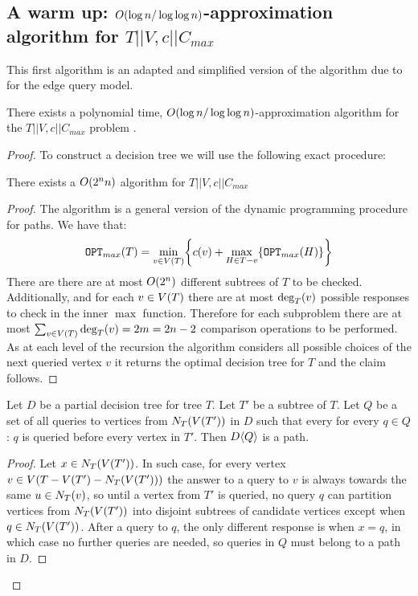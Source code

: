 \subsection{A warm up: $O\mathopen{}\left( \log n/\log\log n \right)$-approximation algorithm  for $T||V,c||C_{max}$}
This first algorithm is an adapted and simplified version of the algorithm due to \cite{Cicalese2016OnTSPwNonUniCost} for the edge query model.
\begin{theorem}
    There exists a polynomial time, $O\mathopen{}\left( \log n/\log\log n \right)$-approximation algorithm for the $T||V,c||C_{max}$ problem .
    \begin{proof}
        
To construct a decision tree we will use the following exact procedure:
\begin{lemma}
    There exists a $O\mathopen{}\left( 2^nn \right)$ algorithm for $T||V,c||C_{max}$
    \begin{proof}
        The algorithm is a general version of the dynamic programming procedure for paths. We have that:
        $$
        \texttt{OPT}_{max}\mathopen{}\left( T \right) = \min_{v\in V\mathopen{}\left( T \right)}\mathopen{}\left\{ c\mathopen{}\left( v \right)+\max_{H\in T-v}\mathopen{}\left\{ \texttt{OPT}_{max}\mathopen{}\left( H \right) \right\} \right\}
        $$
        There are there are at most $O\mathopen{}\left( 2^n \right)$ different subtrees of $T$ to be checked. Additionally, and for each $v\in V\mathopen{}\left( T \right)$ there are at most $\deg_T\mathopen{}\left( v \right)$ possible responses to check in the inner $\max$ function. Therefore for each subproblem there are at most
        $
        \sum_{v\in V\mathopen{}\left( T \right)}\deg_T\mathopen{}\left( v \right) = 2m = 2n-2
        $
        comparison operations to be performed. As at each level of the recursion the algorithm considers all possible choices of the next queried vertex $v$ it returns the optimal decision tree for $T$ and the claim follows.
    \end{proof}
\end{lemma}
\begin{observation}\label{neighborsPathObservation}
    Let $D$ be a partial decision tree for tree $T$. Let $T'$ be a subtree of $T$. Let $Q$ be a set of all queries to vertices from $N_{T}\mathopen{}\left( V\mathopen{}\left( T' \right) \right)$ in $D$ such that every for every $q\in Q$: $q$ is queried before every vertex in $T'$. Then $D\mathopen{}\langle Q \rangle$ is a path. 
    \begin{proof}
        Let $x\in N_{T}\mathopen{}\left( V\mathopen{}\left( T' \right) \right)$. In such case, for every vertex $v\in V\mathopen{}\left( T-V\mathopen{}\left( T' \right)-N_{T}\mathopen{}\left( V\mathopen{}\left( T' \right) \right) \right)$ the answer to a query to $v$ is always towards the same $u\in N_{T}\mathopen{}\left( v \right)$, so until a vertex from $T'$ is queried, no query $q$ can partition vertices from $N_{T}\mathopen{}\left( V\mathopen{}\left( T' \right) \right)$ into disjoint subtrees of candidate vertices except when $q\in N_{T}\mathopen{}\left( V\mathopen{}\left( T' \right) \right)$. After a query to $q$, the only different response is when $x=q$, in which case no further queries are needed, so queries in $Q$ must belong to a path in $D$.
    \end{proof}
\end{observation}




\end{proof}
\end{theorem}
